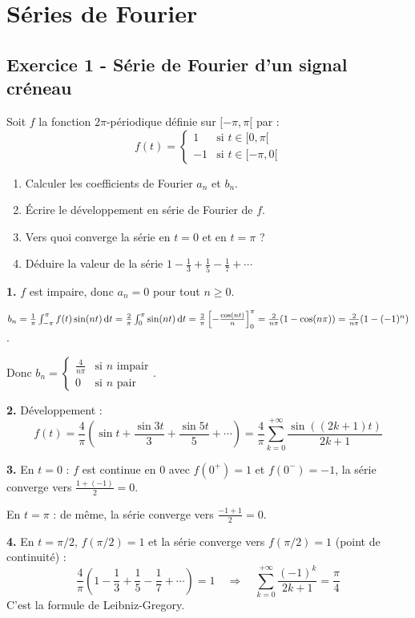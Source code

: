 \documentclass[12pt,a4paper]{article}
\begin{document}
\newpage
\section{Séries de Fourier}

\subsection*{Exercice 1 - Série de Fourier d'un signal créneau \niveau{\facile}}

\begin{boiteexercice}
Soit $f$ la fonction $2\pi$-périodique définie sur $[-\pi,\pi[$ par :
\[
f(t) = \begin{cases}1 & \text{si } t\in[0,\pi[\\-1 & \text{si } t\in[-\pi,0[\end{cases}
\]
\begin{enumerate}
  \item Calculer les coefficients de Fourier $a_n$ et $b_n$.
  \item Écrire le développement en série de Fourier de $f$.
  \item Vers quoi converge la série en $t=0$ et en $t=\pi$ ?
  \item Déduire la valeur de la série $1 - \frac{1}{3} + \frac{1}{5} - \frac{1}{7} + \cdots$
\end{enumerate}
\end{boiteexercice}

\begin{boitecorrige}
\textbf{1.} $f$ est impaire, donc $a_n = 0$ pour tout $n\geq0$.

$b_n = \frac{1}{\pi}\int_{-\pi}^{\pi} f(t)\sin(nt)\,\mathrm{d} t = \frac{2}{\pi}\int_0^\pi \sin(nt)\,\mathrm{d} t = \frac{2}{\pi}\left[-\frac{\cos(nt)}{n}\right]_0^\pi = \frac{2}{n\pi}(1-\cos(n\pi)) = \frac{2}{n\pi}(1-(-1)^n)$.

Donc $b_n = \begin{cases}\frac{4}{n\pi} & \text{si } n \text{ impair}\\0 & \text{si } n \text{ pair}\end{cases}$.

\textbf{2.} Développement :
\[
f(t) = \frac{4}{\pi}\left(\sin t + \frac{\sin 3t}{3} + \frac{\sin 5t}{5} + \cdots\right) = \frac{4}{\pi}\sum_{k=0}^{+\infty}\frac{\sin((2k+1)t)}{2k+1}
\]

\textbf{3.} En $t=0$ : $f$ est continue en 0 avec $f(0^+)=1$ et $f(0^-)=-1$, la série converge vers $\frac{1+(-1)}{2}=0$.

En $t=\pi$ : de même, la série converge vers $\frac{-1+1}{2}=0$.

\textbf{4.} En $t=\pi/2$, $f(\pi/2)=1$ et la série converge vers $f(\pi/2)=1$ (point de continuité) :
\[
\frac{4}{\pi}\left(1 - \frac{1}{3} + \frac{1}{5} - \frac{1}{7}+\cdots\right) = 1 \quad\Rightarrow\quad \sum_{k=0}^{+\infty}\frac{(-1)^k}{2k+1} = \frac{\pi}{4}
\]
C'est la formule de Leibniz-Gregory.
\end{boitecorrige}
\end{document}
